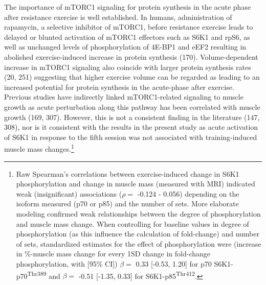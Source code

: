 \documentclass[twoside,10pt]{gihclass} %
\begin{document}
The importance of mTORC1 signaling for protein synthesis in the acute phase after resistance exercise is well established.
In humans, administration of rapamycin, a selective inhibitor of mTORC1, before resistance exercise leads to delayed or blunted activation of mTORC1 effectors such as
S6K1 and rpS6, as well as unchanged levels of phosphorylation of 4E-BP1 and eEF2 resulting in abolished exercise-induced increase in protein synthesis
(170).
Volume-dependent increase in mTORC1 signaling also coincide with larger protein synthesis rates
(20, 251)
suggesting that higher exercise volume can be regarded as leading to an increased potential for protein synthesis in the acute-phase after exercise.
Previous studies have indirectly linked mTORC1-related signaling to muscle growth as acute perturbation along this pathway has been correlated with muscle growth
(169, 307).
However, this is not a consistent finding in the literature
(147, 308),
nor is it consistent with the results in the present study as acute activation of S6K1 in response to the fifth session was not associated with training-induced muscle mass changes.\footnote{Raw Spearman's correlations between exercise-induced change in S6K1 phosphorylation and change in muscle mass (measured with MRI) indicated weak (insignificant) associations (\(\rho=\) -0.124 - 0.056) depending on the isoform measured (p70 or p85) and the number of sets. More elaborate modeling confirmed weak relationships between the degree of phosphorylation and muscle mass change. When controlling for baseline values in degree of phosphorylation (as this influence the calculation of fold-change) and number of sets, standardized estimates for the effect of phosphorylation were (increase in \%-muscle mass change for every 1SD change in fold-change phosphorylation, with {[}95\% CI{]}) \(\beta=\) 0.33 {[}-0.53, 1.20{]} for p70 S6K1-p70\textsuperscript{Thr389} and \(\beta=\) -0.51 {[}-1.35, 0.33{]} for S6K1-p85\textsuperscript{Thr412}.}
\end{document}

